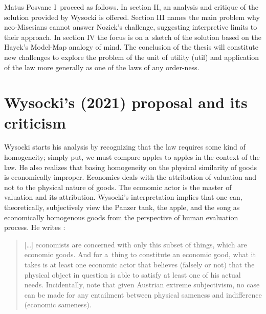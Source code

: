\begin{artengenv}{Matus Posvanc}
I~proceed as follows. In section II, an analysis and critique of the solution provided by Wysocki 
\parencite*[][]{Wysocki2021problem} %
 is offered. Section III names the main problem why neo-Misesians cannot answer Nozick's challenge, suggesting interpretive limits to their approach. In section IV the focus is on a~sketch of the solution based on the Hayek's Model-Map analogy of mind. The conclusion of the thesis will constitute new challenges to explore the problem of the unit of utility (util) and application of the law more generally as one of the laws of any order-ness.



\section{Wysocki's (2021) proposal and its criticism}



Wysocki starts his analysis by recognizing that the law requires some kind of homogeneity; simply put, we must compare {\textquotedbl}apples to apples{\textquotedbl} in the context of the law. He also realizes that basing homogeneity on the physical similarity of goods is economically improper. Economics deals with the attribution of valuation and not to the physical nature of goods. The economic actor is the master of valuation and its attribution. Wysocki's interpretation implies that one can, theoretically, subjectively view the Panzer tank, the apple, and the song as economically homogenous goods from the perspective of human evaluation process. He writes 
\parencite[][p.14]{Wysocki2021problem}:%




\begin{quote}
[…] economists are concerned with only this subset of things, which are economic goods. And for a~thing to constitute an economic good, what it takes is at least one economic actor that believes (falsely or not) that the physical object in question is able to satisfy at least one of his actual needs. Incidentally, note that given Austrian extreme subjectivism, no case can be made for any entailment between physical sameness and indifference (economic sameness).
\end{quote}




\end{artengenv}
